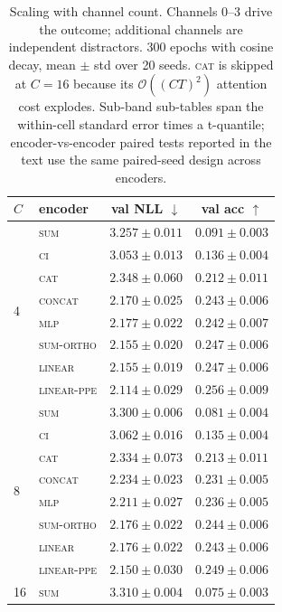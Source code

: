 \begin{table}[t]
\centering
\caption{Scaling with channel count. Channels $0$--$3$ drive the
outcome; additional channels are independent distractors. 300 epochs
with cosine decay, mean $\pm$ std over 20 seeds. \textsc{cat} is
skipped at $C{=}16$ because its $\mathcal{O}((CT)^2)$ attention cost
explodes. Sub-band sub-tables span the within-cell standard error
times a t-quantile; encoder-vs-encoder paired tests reported in the
text use the same paired-seed design across encoders.}
\label{tab:scaling}
\begin{tabular}{llcc}
\toprule
$C$ & encoder & val NLL $\downarrow$ & val acc $\uparrow$ \\
\midrule
\multirow{8}{*}{4}
    & \textsc{sum}        & $3.257 \pm 0.011$ & $0.091 \pm 0.003$ \\
    & \textsc{ci}         & $3.053 \pm 0.013$ & $0.136 \pm 0.004$ \\
    & \textsc{cat}        & $2.348 \pm 0.060$ & $0.212 \pm 0.011$ \\
    & \textsc{concat}     & $2.170 \pm 0.025$ & $0.243 \pm 0.006$ \\
    & \textsc{mlp}        & $2.177 \pm 0.022$ & $0.242 \pm 0.007$ \\
    & \textsc{sum-ortho}  & $2.155 \pm 0.020$ & $0.247 \pm 0.006$ \\
    & \textsc{linear}     & $2.155 \pm 0.019$ & $0.247 \pm 0.006$ \\
    & \textsc{linear-ppe} & $2.114 \pm 0.029$ & $0.256 \pm 0.009$ \\
\midrule
\multirow{8}{*}{8}
    & \textsc{sum}        & $3.300 \pm 0.006$ & $0.081 \pm 0.004$ \\
    & \textsc{ci}         & $3.062 \pm 0.016$ & $0.135 \pm 0.004$ \\
    & \textsc{cat}        & $2.334 \pm 0.073$ & $0.213 \pm 0.011$ \\
    & \textsc{concat}     & $2.234 \pm 0.023$ & $0.231 \pm 0.005$ \\
    & \textsc{mlp}        & $2.211 \pm 0.027$ & $0.236 \pm 0.005$ \\
    & \textsc{sum-ortho}  & $2.176 \pm 0.022$ & $0.244 \pm 0.006$ \\
    & \textsc{linear}     & $2.176 \pm 0.022$ & $0.243 \pm 0.006$ \\
    & \textsc{linear-ppe} & $2.150 \pm 0.030$ & $0.249 \pm 0.006$ \\
\midrule
\multirow{7}{*}{16}
    & \textsc{sum}        & $3.310 \pm 0.004$ & $0.075 \pm 0.003$ \\

\end{tabular}
\end{table}
